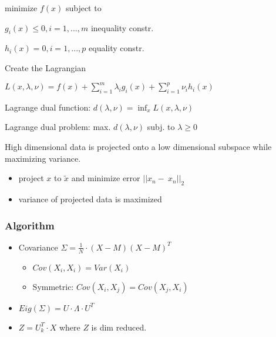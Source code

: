 \documentclass[11pt,twocolumn]{article}
\begin{document}
minimize $f(x)$ subject to 

$g_i(x) \leq 0, i = 1,...,m$ inequality constr.

$h_i(x) = 0, i = 1,...,p$ equality constr.

Create the Lagrangian

$L(x, \lambda, \nu) = f(x) + \sum_{i=1}^m{\lambda_i g_i(x) + \sum_{i=1}^p{\nu_i h_i(x)}}$

Lagrange dual function: $ d(\lambda, \nu) = \inf_{x} L (x,\lambda, \nu) $

Lagrange dual problem: max. $d(\lambda, \nu)$  subj. to $\lambda \geq 0$


	

\maketitle




High dimensional data is projected onto a low dimensional subspace while maximizing variance.

\begin{itemize}
\item project $x$ to $\tilde{x}$ and minimize error $|| x_n - ~x_n ||_2$
\item variance of projected data is maximized
\end{itemize}

\subsubsection{Algorithm}

\begin{itemize}
\item Covariance $\Sigma = \frac{1}{N} \cdot (  X - M ) ( X - M )^T$
\begin{itemize}
\item $Cov(X_i, X_i) = Var(X_i)$
\item Symmetric: $ Cov(X_i,X_j) = Cov(X_j, X_i)$
\end{itemize}
\item $Eig(\Sigma) = U \cdot \Lambda \cdot U^T$
\item $Z = U_k^T \cdot X$ where $Z$ is dim reduced.

\end{itemize}
\end{document}
